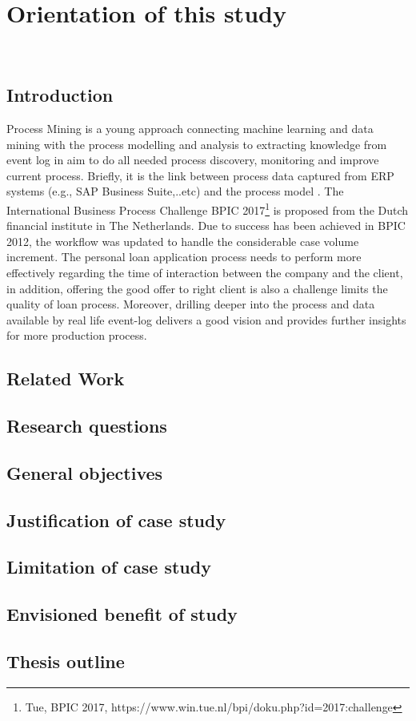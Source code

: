 \chapter{Orientation of this study}
\\ 

\section{Introduction}
Process Mining is a young approach connecting machine learning and data mining with the process modelling and analysis to extracting knowledge from event log in aim to do all needed process discovery, monitoring and improve current process. Briefly, it is the link between process data captured from ERP systems (e.g., SAP Business Suite,..etc) and the process model \cite{manifesto}.
The International Business Process Challenge BPIC 2017\footnote{Tue, BPIC 2017, https://www.win.tue.nl/bpi/doku.php?id=2017:challenge} is proposed from the Dutch financial institute in The Netherlands. Due to success has been achieved in BPIC 2012, the workflow was updated to handle the considerable case volume increment. The personal loan application process needs to perform more effectively regarding the time of interaction between the company and the client, in addition, offering the good offer to right client is also a challenge limits the quality of loan process. Moreover, drilling deeper into the process and data available by real life event-log delivers a good vision and provides further insights for more production process.


\section{Related Work}
\section{Research questions}
\section{General objectives}
\section{Justification of case study}
\section{Limitation of case study}
\section{Envisioned benefit of study}
\section{Thesis outline}

